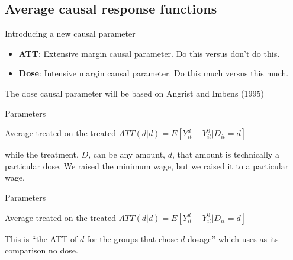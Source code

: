\documentclass{beamer}
\begin{document}
\subsection{Average causal response functions}


\begin{frame}{Introducing a new causal parameter}



\begin{itemize}
\item \textbf{ATT}: Extensive margin causal parameter.  Do this versus don't do this.
\item \textbf{Dose}: Intensive margin causal parameter.  Do this much versus this much.
\end{itemize}

\bigskip

The dose causal parameter will be based on Angrist and Imbens (1995)

\end{frame}




\begin{frame}{Parameters}

\begin{block}{Average treated on the treated}
$ATT(d|d) = E[Y^d_{it} - Y^0_{it} | D_{it}=d]$
\end{block}

\bigskip

while the treatment, $D$, can be any amount, $d$, that amount is technically a particular dose.  We raised the minimum wage, but we raised it to a particular wage. 

\end{frame}


\begin{frame}{Parameters}

\begin{block}{Average treated on the treated}
$ATT(d|d) = E[Y^d_{it} - Y^0_{it} | D_{it}=d]$
\end{block}

\bigskip

This is ``the ATT of $d$ for the groups that chose $d$ dosage'' which uses as its comparison no dose.

\end{frame}
\end{document}
